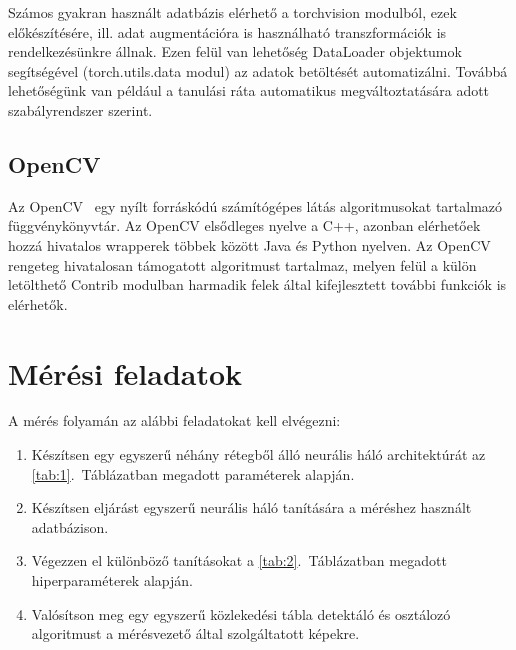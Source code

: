 \documentclass[12pt,a4paper,oneside]{report}             %
\begin{document}
Számos gyakran használt adatbázis elérhető a torchvision modulból, ezek előkészítésére, ill. adat augmentációra is használható transzformációk is rendelkezésünkre állnak. Ezen felül van lehetőség DataLoader objektumok segítségével (torch.utils.data modul) az adatok betöltését automatizálni. Továbbá lehetőségünk van például a tanulási ráta automatikus megváltoztatására adott szabályrendszer szerint.

\section{OpenCV}

Az OpenCV~\cite{opencv} egy nyílt forráskódú számítógépes látás algoritmusokat tartalmazó függvénykönyvtár. Az OpenCV elsődleges nyelve a C++, azonban elérhetőek hozzá hivatalos wrapperek többek között Java és Python nyelven. Az OpenCV rengeteg hivatalosan támogatott algoritmust tartalmaz, melyen felül a külön letölthető Contrib modulban harmadik felek által kifejlesztett további funkciók is elérhetők.

\chapter{Mérési feladatok}

A mérés folyamán az alábbi feladatokat kell elvégezni:

\begin{enumerate}
\item Készítsen egy egyszerű néhány rétegből álló neurális háló architektúrát az \ref{tab:1}.~Táblázatban megadott paraméterek alapján.
\item Készítsen eljárást egyszerű neurális háló tanítására a méréshez használt adatbázison.
\item Végezzen el különböző tanításokat a \ref{tab:2}.~Táblázatban megadott hiperparaméterek alapján.
\item Valósítson meg egy egyszerű közlekedési tábla detektáló és osztálozó algoritmust a mérésvezető által szolgáltatott képekre.
\end{enumerate}
\end{document}
